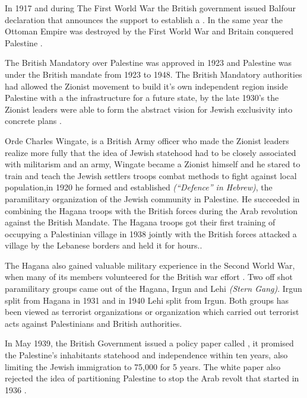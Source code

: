  In 1917 and during The First World War the British government issued Balfour declaration that  announces the support to establish a . In the same year the Ottoman Empire was destroyed by the First World War and Britain conquered Palestine \citep{Morris2004}.  
 
 
 
 
 
 The British Mandatory over Palestine was approved in 1923 and Palestine was under the British mandate from 1923 to 1948. The British Mandatory authorities had allowed the Zionist movement to build it's own independent region inside Palestine with a the infrastructure for a future state, by the late 1930's the Zionist leaders were able to form the abstract vision for Jewish exclusivity into concrete plans \citep{Pappe2006}.  
 
Orde Charles Wingate, is a British Army officer who made the Zionist leaders realize more fully that the idea of Jewish statehood had to be closely associated with militarism and an army, Wingate became a Zionist himself and he stared to train and teach the Jewish settlers troops combat methods to fight against local population,in 1920 he formed and established  \textit{(“Defence” in Hebrew)}, the paramilitary organization of the Jewish community in Palestine. He succeeded in combining the Hagana troops with the British forces during the Arab revolution against the British Mandate. The Hagana troops got their first training of occupying a Palestinian village in 1938 jointly with the British forces attacked a village by the Lebanese borders and held it for hours\citep{Pappe2006}.\cite [p.112]{Fenby2018}. 

The Hagana also gained valuable military experience in the Second
World War, when many of its members volunteered for the British war
effort \citep{Pappe2006}. Two off shot paramilitary groups came out of the Hagana, Irgun and Lehi \textit{(Stern Gang)}. Irgun split from Hagana in 1931 and in 1940 Lehi split from Irgun\citep{Shlaim2014}. Both groups has been viewed as terrorist organizations or organization which carried out terrorist acts against Palestinians and British authorities\citep{Bell1976}.   


In May 1939, the British Government issued a policy paper called , it promised the Palestine's inhabitants statehood and independence within ten years, also limiting the Jewish immigration to 75,000 for 5 years. The white paper also rejected the idea of partitioning Palestine to stop the Arab revolt that started in 1936 \citep{Morris2004}\citep{Fenby2018}.

